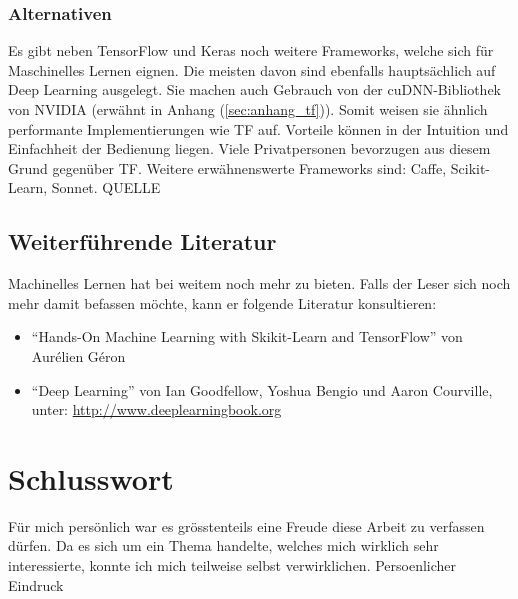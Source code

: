 \subsection*{Alternativen}
Es gibt neben TensorFlow und Keras noch weitere Frameworks, welche sich für
Maschinelles Lernen eignen. Die meisten davon sind ebenfalls hauptsächlich auf Deep
Learning ausgelegt. Sie machen auch Gebrauch von der cuDNN-Bibliothek
von NVIDIA (erwähnt in Anhang (\ref{sec:anhang_tf})). Somit weisen sie
ähnlich performante Implementierungen wie TF auf. Vorteile können in der
Intuition und Einfachheit der Bedienung liegen. Viele Privatpersonen bevorzugen
aus diesem Grund  gegenüber TF.
Weitere erwähnenswerte Frameworks sind: Caffe, Scikit-Learn, Sonnet.
QUELLE

\section*{Weiterführende Literatur}
Machinelles Lernen hat bei weitem noch mehr zu bieten. Falls der Leser sich noch
mehr damit befassen möchte, kann er folgende Literatur konsultieren:
\begin{itemize}
\item{``Hands-On Machine Learning with Skikit-Learn and TensorFlow'' von Aurélien Géron}
  \item{``Deep Learning'' von Ian Goodfellow, Yoshua Bengio und Aaron Courville,
      unter: \url{http://www.deeplearningbook.org}}
\end{itemize}


\chapter*{Schlusswort}

Für mich persönlich war es grösstenteils eine Freude diese Arbeit zu verfassen
dürfen. Da es sich um ein Thema handelte, welches mich wirklich sehr
interessierte, konnte ich mich teilweise selbst verwirklichen.
Persoenlicher Eindruck


